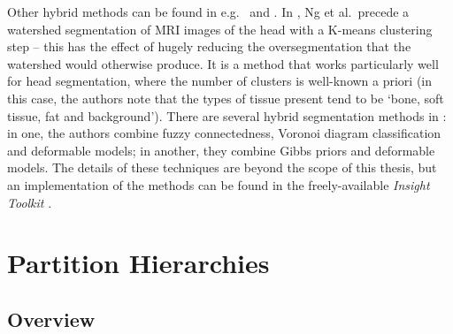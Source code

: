 Other hybrid methods can be found in e.g.~\cite{ng06} and \cite{itk}. In \cite{ng06}, Ng et al.\ precede a watershed segmentation of MRI images of the head with a K-means clustering step -- this has the effect of hugely reducing the oversegmentation that the watershed would otherwise produce. It is a method that works particularly well for head segmentation, where the number of clusters is well-known a priori (in this case, the authors note that the types of tissue present tend to be `bone, soft tissue, fat and background'). There are several hybrid segmentation methods in \cite{itk}: in one, the authors combine fuzzy connectedness, Voronoi diagram classification and deformable models; in another, they combine Gibbs priors and deformable models. The details of these techniques are beyond the scope of this thesis, but an implementation of the methods can be found in the freely-available \emph{Insight Toolkit} \cite{itk}.



\clearpage

\section{Partition Hierarchies}
\label{sec:background-partitionhierarchies}



\subsection{Overview}

